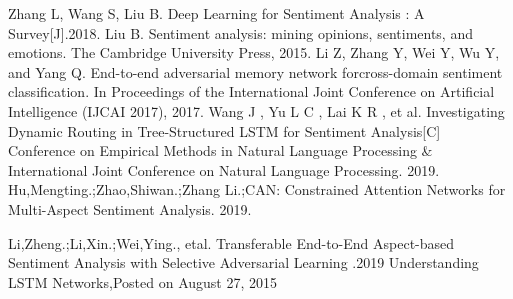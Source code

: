 \documentclass[twocolumn]{ctexart}
\begin{document}
\begin{thebibliography}{99}  
 Zhang L, Wang S, Liu B. Deep Learning for Sentiment Analysis : A Survey[J].2018.
 Liu  B.  Sentiment  analysis:  mining  opinions,  sentiments,  and  emotions.  The  Cambridge  University  Press, 2015.
Li  Z,  Zhang Y,  Wei  Y,  Wu  Y, and Yang  Q.  End-to-end  adversarial  memory  network  forcross-domain sentiment  classification.  In Proceedings  of  the  International  Joint  Conference  on  Artificial  Intelligence  (IJCAI 2017), 2017.  
Wang J , Yu L C , Lai K R , et al. Investigating Dynamic Routing in Tree-Structured LSTM for Sentiment Analysis[C] Conference on Empirical Methods in Natural Language Processing & International Joint Conference on Natural Language Processing. 2019.
 Hu,Mengting.;Zhao,Shiwan.;Zhang Li.;CAN: Constrained Attention Networks for Multi-Aspect Sentiment Analysis. 2019.

 Li,Zheng.;Li,Xin.;Wei,Ying., etal. Transferable End-to-End Aspect-based Sentiment Analysis with Selective Adversarial Learning .2019
Understanding LSTM Networks,Posted on August 27, 2015

\end{thebibliography}
\end{document}
